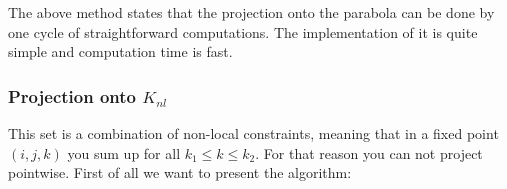 
                The above method states that the projection onto the parabola can be done by one cycle of straightforward computations. The implementation of it is quite simple and computation time is fast.%

            \subsubsection{Projection onto $K_{nl}$}

                This set is a combination of non-local constraints, meaning that in a fixed point $(i, j, k)$ you sum up for all $k_{1} \le k \le k_{2}$. For that reason you can not project pointwise. First of all we want to present the algorithm:

